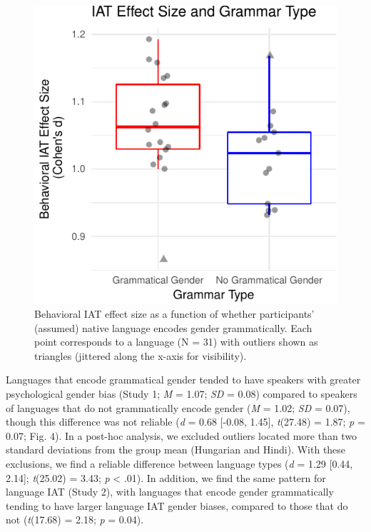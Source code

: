 \documentclass[10pt, letterpaper]{article}
\newenvironment{CodeChunk}{}{}
\begin{document}
\begin{CodeChunk}
\begin{figure}[t]

{\centering \includegraphics{figs/grammatical_gender_plot-1} 

}

\caption[Behavioral IAT effect size as a function of whether participants' (assumed) native language encodes gender grammatically]{Behavioral IAT effect size as a function of whether participants' (assumed) native language encodes gender grammatically. Each point corresponds to a language (N = 31) with outliers shown as triangles (jittered along the x-axis for visibility).}\label{fig:grammatical_gender_plot}
\end{figure}
\end{CodeChunk}

Languages that encode grammatical gender tended to have speakers with
greater psychological gender bias (Study 1; \emph{M} = 1.07; \emph{SD} =
0.08) compared to speakers of languages that do not grammatically encode
gender (\emph{M} = 1.02; \emph{SD} = 0.07), though this difference was
not reliable (\emph{d} = 0.68 {[}-0.08, 1.45{]}, \emph{t}(27.48) = 1.87;
\emph{p} = 0.07; Fig. 4). In a post-hoc analysis, we excluded outliers
located more than two standard deviations from the group mean (Hungarian
and Hindi). With these exclusions, we find a reliable difference between
language types (\emph{d} = 1.29 {[}0.44, 2.14{]}; \emph{t}(25.02) =
3.43; \emph{p} \textless{} .01). In addition, we find the same pattern
for language IAT (Study 2), with languages that encode gender
grammatically tending to have larger language IAT gender biases,
compared to those that do not (\emph{t}(17.68) = 2.18; \emph{p} = 0.04).
\end{document}
